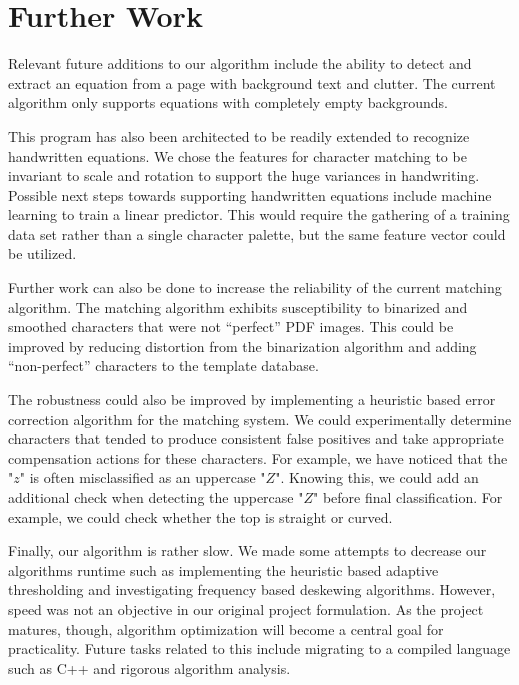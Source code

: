 \documentclass[journal]{IEEEtran}
\begin{document}
\section{Further Work}
Relevant future additions to our algorithm include the ability to detect and extract an equation from a page with background text and clutter. The current algorithm only supports equations with completely empty backgrounds.

This program has also been architected to be readily extended to recognize handwritten equations. We chose the features for character matching to be invariant to scale and rotation to support the huge variances in handwriting. Possible next steps towards supporting handwritten equations include machine learning to train a linear predictor. This would require the gathering of a training data set rather than a single character palette, but the same feature vector could be utilized.

Further work can also be done to increase the reliability of the current matching algorithm. The matching algorithm exhibits susceptibility to binarized and smoothed characters that were not “perfect” PDF images. This could be improved by reducing distortion from the binarization algorithm and adding “non-perfect” characters to the template database. 

The robustness could also be improved by implementing a heuristic based error correction algorithm for the matching system. We could experimentally determine characters that tended to produce consistent false positives and take appropriate compensation actions for these characters. For example, we have noticed that the "$z$"  is often misclassified as an uppercase "$Z$". Knowing this, we could add an additional check when detecting the uppercase "$Z$"  before final classification. For example, we could check whether the top is straight or curved.

Finally, our algorithm is rather slow. We made some attempts to decrease our algorithms runtime such as implementing the heuristic based adaptive thresholding and investigating frequency based deskewing algorithms\cite{Kaur:article_typical}. However, speed was not an objective in our original project formulation. As the project matures, though, algorithm optimization will become a central goal for practicality. Future tasks related to this include migrating to a compiled language such as C++ and rigorous algorithm analysis.




\end{document}
